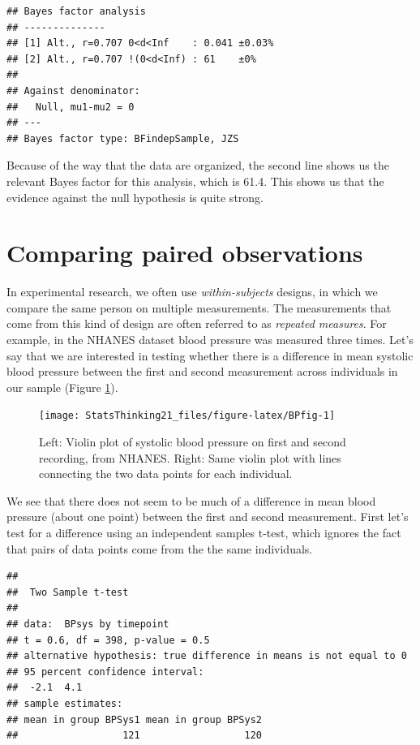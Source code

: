 \documentclass[12pt,]{book}
\theoremstyle{definition}
\theoremstyle{definition}
\theoremstyle{definition}
\theoremstyle{remark}
\begin{document}
\begin{verbatim}
## Bayes factor analysis
## --------------
## [1] Alt., r=0.707 0<d<Inf    : 0.041 ±0.03%
## [2] Alt., r=0.707 !(0<d<Inf) : 61    ±0%
## 
## Against denominator:
##   Null, mu1-mu2 = 0 
## ---
## Bayes factor type: BFindepSample, JZS
\end{verbatim}

Because of the way that the data are organized, the second line shows us the relevant Bayes factor for this analysis, which is 61.4. This shows us that the evidence against the null hypothesis is quite strong.

\hypertarget{paired-ttests}{%
\section{Comparing paired observations}\label{paired-ttests}}

In experimental research, we often use \emph{within-subjects} designs, in which we compare the same person on multiple measurements. The measurements that come from this kind of design are often referred to as \emph{repeated measures}. For example, in the NHANES dataset blood pressure was measured three times. Let's say that we are interested in testing whether there is a difference in mean systolic blood pressure between the first and second measurement across individuals in our sample (Figure \ref{fig:BPfig}).

\begin{figure}
\texttt{[image: StatsThinking21\_files/figure-latex/BPfig-1]} \caption{Left: Violin plot of systolic blood pressure on first and second recording, from NHANES. Right: Same violin plot with lines connecting the two data points for each individual.}\label{fig:BPfig}
\end{figure}

We see that there does not seem to be much of a difference in mean blood pressure (about one point) between the first and second measurement. First let's test for a difference using an independent samples t-test, which ignores the fact that pairs of data points come from the the same individuals.

\begin{verbatim}
## 
##  Two Sample t-test
## 
## data:  BPsys by timepoint
## t = 0.6, df = 398, p-value = 0.5
## alternative hypothesis: true difference in means is not equal to 0
## 95 percent confidence interval:
##  -2.1  4.1
## sample estimates:
## mean in group BPSys1 mean in group BPSys2 
##                  121                  120
\end{verbatim}
\end{document}
